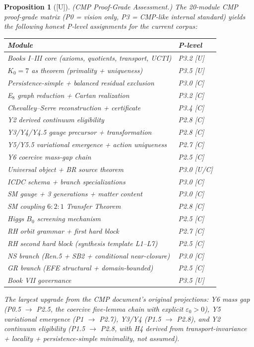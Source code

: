 \documentclass[12pt,oneside]{amsbook}
\theoremstyle{plain}
\newtheorem{proposition}[theorem]{Proposition}
\theoremstyle{definition}
\theoremstyle{remark}
\newcommand{\status}[1]{\textup{[#1]}}
\begin{document}
\begin{proposition}[\status{U}]\label{prop:cmp-p-levels}
\textup{(CMP Proof-Grade Assessment.)}
The 20-module CMP proof-grade matrix (P0 = vision only,
P3 = CMP-like internal standard) yields the following
honest P-level assignments for the current corpus:

\medskip
\noindent
\begin{tabular}{ll}
\hline
\textbf{Module} & \textbf{P-level} \\
\hline
Books I--III core (axioms, quotients, transport, UCTI) & P3.2 [U] \\
$K_0 = 7$ as theorem (primality + uniqueness) & P3.5 [U] \\
Persistence-simple + balanced residual exclusion & P3.0 [C] \\
E$_8$ graph reduction + Cartan realization & P3.2 [C] \\
Chevalley--Serre reconstruction + certificate & P3.4 [C] \\
Y2 derived continuum eligibility & P2.8 [C] \\
Y3/Y4/Y4.5 gauge precursor + transformation & P2.8 [C] \\
Y5/Y5.5 variational emergence + action uniqueness & P2.7 [C] \\
Y6 coercive mass-gap chain & P2.5 [C] \\
Universal object + BR source theorem & P3.0 [U/C] \\
ICDC schema + branch specializations & P3.0 [C] \\
SM gauge + 3 generations + matter content & P3.0 [C] \\
SM coupling $6:2:1$ Transfer Theorem & P2.8 [C] \\
Higgs $B_0$ screening mechanism & P2.5 [C] \\
RH orbit grammar + first hard block & P2.7 [C] \\
RH second hard block (synthesis template L1--L7) & P2.5 [C] \\
NS branch (Ren.5 + SB2 + conditional near-closure) & P3.0 [C] \\
GR branch (EFE structural + domain-bounded) & P2.5 [C] \\
Book VII governance & P3.5 [U] \\
\hline
\end{tabular}

\medskip
The largest upgrade from the CMP document's original projections:
Y6 mass gap (P0.5 $\to$ P2.5, the coercive five-lemma chain with
explicit $\varepsilon_0 > 0$), Y5 variational emergence
(P1 $\to$ P2.7), Y3/Y4 (P1.5 $\to$ P2.8), and Y2 continuum
eligibility (P1.5 $\to$ P2.8, with H4 derived from
transport-invariance + locality + persistence-simple minimality,
not assumed).
\end{proposition}
\end{document}

